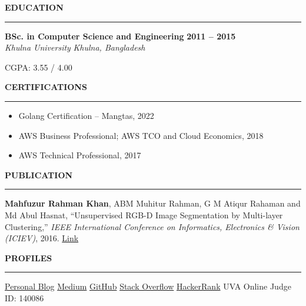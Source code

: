 \documentclass[10pt,a4paper]{article}
\newcommand{\cvsection}[1]{%
  \vspace{0.55em}
  {\normalsize\bfseries\MakeUppercase{#1}}\par
  \vspace{0.12em}\hrule\vspace{0.28em}
}
\newcommand{\roleentry}[4]{%
  \textbf{#1} \hfill \textbf{#2}\\
  \textit{#3} \hfill \textit{#4}\par\vspace{-0.12em}
}
\newenvironment{cvitems}{%
  \begin{itemize}
    \setlength{\itemsep}{0.03em}
    \setlength{\parskip}{0pt}
    \setlength{\parsep}{0pt}
    \setlength{\topsep}{0.08em}
    \setlength{\leftmargin}{1.2em}
}{\end{itemize}}
\begin{document}
\cvsection{Education}
\roleentry{BSc. in Computer Science and Engineering}{2011 -- 2015}{Khulna University}{Khulna, Bangladesh}
CGPA: 3.55 / 4.00

\cvsection{Certifications}
\begin{cvitems}
  \item Golang Certification -- Mangtas, 2022
  \item AWS Business Professional; AWS TCO and Cloud Economics, 2018
  \item AWS Technical Professional, 2017
\end{cvitems}

\cvsection{Publication}
\textbf{Mahfuzur Rahman Khan}, ABM Muhitur Rahman, G M Atiqur Rahaman and Md Abul Hasnat, ``Unsupervised RGB-D Image Segmentation by Multi-layer Clustering,'' \textit{IEEE International Conference on Informatics, Electronics \& Vision (ICIEV)}, 2016.
\href{https://ieeexplore.ieee.org/document/7760095/}{Link}

\cvsection{Profiles}
\href{https://mr-khan.gitlab.io/}{Personal Blog} \textbar{}
\href{https://medium.com/@mahfuz110244}{Medium} \textbar{}
\href{https://github.com/mahfuz110244}{GitHub} \textbar{}
\href{http://stackoverflow.com/users/2713054/mahfuz110244}{Stack Overflow} \textbar{}
\href{https://www.hackerrank.com/mahfuz110244}{HackerRank} \textbar{}
UVA Online Judge ID: 140086
\end{document}
